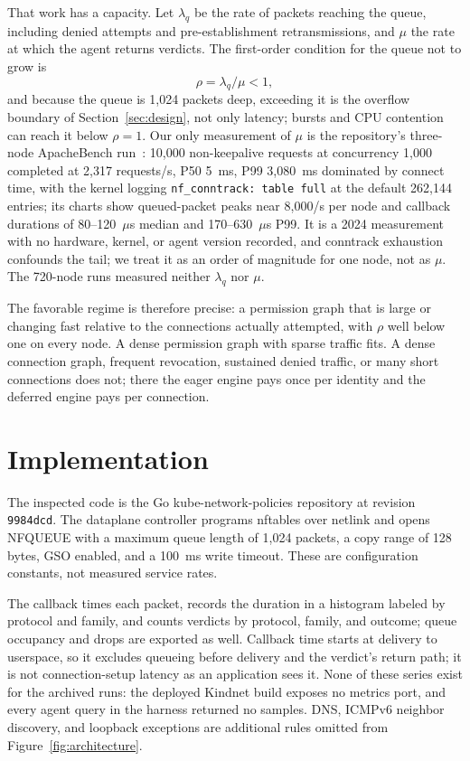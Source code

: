 That work has a capacity. Let $\lambda_q$ be the rate of packets reaching
the queue, including denied attempts and pre-establishment
retransmissions, and $\mu$ the rate at which the agent returns verdicts.
The first-order condition for the queue not to grow is
\begin{equation}
\rho = \lambda_q/\mu < 1,
\end{equation}
and because the queue is 1,024 packets deep, exceeding it is the
overflow boundary of Section~\ref{sec:design}, not only latency;
bursts and CPU contention can reach it below $\rho=1$. Our only
measurement of $\mu$ is the repository's three-node ApacheBench
run~\cite{knptesting}: 10,000 non-keepalive requests at concurrency 1,000
completed at 2,317 requests/s, P50 5~ms, P99 3,080~ms dominated by
connect time, with the kernel logging \texttt{nf\_conntrack: table full}
at the default 262,144 entries; its charts show queued-packet peaks near
8,000/s per node and callback durations of 80--120~$\mu$s median and
170--630~$\mu$s P99. It is a 2024 measurement with no hardware, kernel,
or agent version recorded, and conntrack exhaustion confounds the tail;
we treat it as an order of magnitude for one node, not as $\mu$. The
720-node runs measured neither $\lambda_q$ nor $\mu$.

The favorable regime is therefore precise: a permission graph that is
large or changing fast relative to the connections actually attempted,
with $\rho$ well below one on every node. A dense permission graph with
sparse traffic fits. A dense connection graph, frequent revocation,
sustained denied traffic, or many short connections does not; there the
eager engine pays once per identity and the deferred engine pays per
connection.

\section{Implementation}
\label{sec:implementation}
The inspected code is the Go kube-network-policies repository at revision
\texttt{9984dcd}. The dataplane controller programs nftables over netlink
and opens NFQUEUE with a maximum queue length of 1,024 packets, a copy
range of 128 bytes, GSO enabled, and a 100~ms write timeout. These are
configuration constants, not measured service rates.

The callback times each packet, records the duration in a histogram
labeled by protocol and family, and counts verdicts by protocol, family,
and outcome; queue occupancy and drops are exported as well. Callback
time starts at delivery to userspace, so it excludes queueing before
delivery and the verdict's return path; it is not connection-setup
latency as an application sees it. None of these series exist for the
archived runs: the deployed Kindnet build exposes no metrics port, and
every agent query in the harness returned no samples. DNS, ICMPv6
neighbor discovery, and loopback exceptions are additional rules omitted
from Figure~\ref{fig:architecture}.

